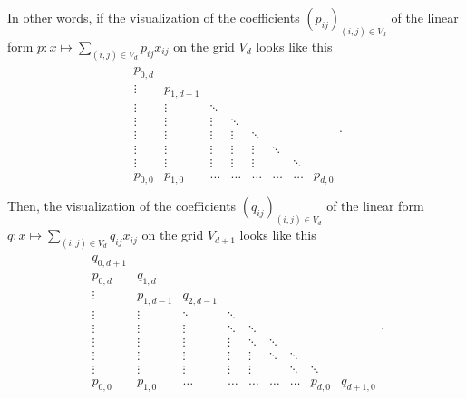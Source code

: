 \begin{proposition}
    In other words, if the visualization of the coefficients \( (p_{ij})_{(i,j) \in V_d} \) of the linear form \( p: x \mapsto \sum_{(i,j) \in V_d} p_{ij}x_{ij} \) on the grid \( V_d \) looks like this
    \begin{align*}
      \begin{matrix}
        p_{0,d} & & & \\
        \vdots & p_{1,d-1} & & &    \\
        \vdots & \vdots & \ddots & &    \\
        \vdots & \vdots & \vdots & \ddots &    \\
        \vdots & \vdots & \vdots & \vdots & \ddots &  &\\
        \vdots & \vdots & \vdots & \vdots &  \vdots  & \ddots  \\
        \vdots & \vdots & \vdots & \vdots &  \vdots  & & \ddots\\
        p_{0,0} & p_{1,0} & \hdots & \hdots &  \hdots  & \hdots & \hdots & p_{d,0} \\
      \end{matrix}.
    \end{align*}
    Then, the visualization of the coefficients \( (q_{ij})_{(i,j) \in V_d} \) of the linear form \( q: x \mapsto \sum_{(i,j) \in V_d} q_{ij}x_{ij} \) on the grid \( V_{d+1} \) looks like this
    \begin{align*}
      \begin{matrix}
        q_{0,{d+1}} & & & \\
        p_{0,d} & q_{1, d} & & \\
        \vdots & p_{1,d-1} & q_{2, d-1} & &    \\
        \vdots & \vdots & \ddots & \ddots &    \\
        \vdots & \vdots & \vdots & \ddots & \ddots    \\
        \vdots & \vdots & \vdots & \vdots & \ddots & \ddots &\\
        \vdots & \vdots & \vdots & \vdots &  \vdots  & \ddots & \ddots  \\
        \vdots & \vdots & \vdots & \vdots &  \vdots  & & \ddots & \ddots \\
        p_{0,0} & p_{1,0} & \hdots & \hdots &  \hdots  & \hdots & \hdots & p_{d,0} & q_{d+1, 0} \\
      \end{matrix}.
    \end{align*}
  \end{proposition}
  
